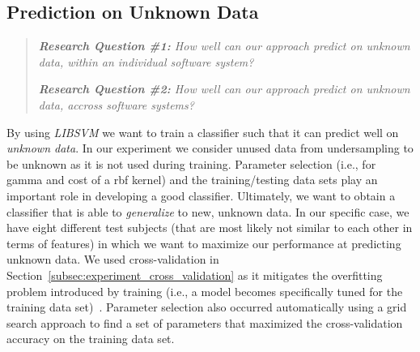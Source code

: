 \subsection{Prediction on Unknown Data}
\label{subsec:experiment_prediction}
\begin{quote}
  \emph{\textbf{Research Question \#1:} How well can our approach predict on unknown data, within an individual software system?}
  
  \emph{\textbf{Research Question \#2:} How well can our approach predict on unknown data, accross software systems?}
\end{quote}

\noindent
By using \emph{LIBSVM} we want to train a classifier such that it can predict well on \emph{unknown data}. In our experiment we consider unused data from undersampling to be unknown as it is not used during training. Parameter selection (i.e., for gamma and cost of a \gls{rbf} kernel) and the training/testing data sets play an important role in developing a good classifier. Ultimately, we want to obtain a classifier that is able to \emph{generalize} to new, unknown data. In our specific case, we have eight different test subjects (that are most likely not similar to each other in terms of features) in which we want to maximize our performance at predicting unknown data. We used cross-validation in Section~\ref{subsec:experiment_cross_validation} as it mitigates the overfitting problem introduced by training (i.e., a model becomes specifically tuned for the training data set)~\cite{HCL03}. Parameter selection also occurred automatically using a grid search approach to find a set of parameters that maximized the cross-validation accuracy on the training data set.

